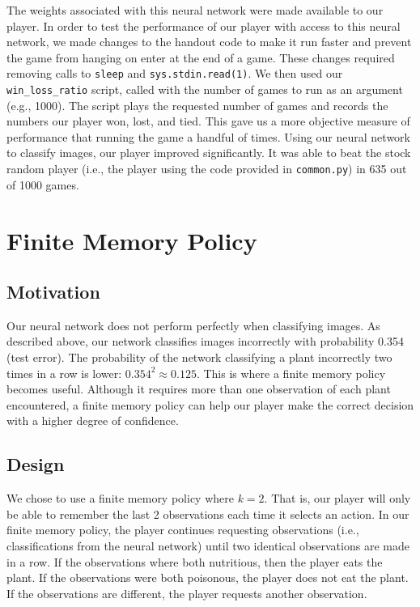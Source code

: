 \documentclass[solution, letterpaper]{cs121}
\begin{document}
The weights associated with this neural network were made available to our player. In order to test the performance of our player with access to this neural network, we made changes to the handout code to make it run faster and prevent the game from hanging on enter at the end of a game. These changes required removing calls to {\tt sleep} and {\tt sys.stdin.read(1)}. We then used our {\tt win\_loss\_ratio} script, called with the number of games to run as an argument (e.g., 1000). The script plays the requested number of games and records the numbers our player won, lost, and tied. This gave us a more objective measure of performance that running the game a handful of times. Using our neural network to classify images, our player improved significantly. It was able to beat the stock random player (i.e., the player using the code provided in {\tt common.py}) in 635 out of 1000 games.

\section{Finite Memory Policy}
\subsection{Motivation}
\hspace{4mm} Our neural network does not perform perfectly when classifying images. As described above, our network classifies images incorrectly with probability 0.354 (test error). The probability of the network classifying a plant incorrectly two times in a row is lower: $0.354^2 \approx 0.125$. This is where a finite memory policy becomes useful. Although it requires more than one observation of each plant encountered, a finite memory policy can help our player make the correct decision with a higher degree of confidence.

\subsection{Design}
\hspace{4mm} We chose to use a finite memory policy where $k=2$. That is, our player will only be able to remember the last 2 observations each time it selects an action. In our finite memory policy, the player continues requesting observations (i.e., classifications from the neural network) until two identical observations are made in a row. If the observations where both nutritious, then the player eats the plant. If the observations were both poisonous, the player does not eat the plant. If the observations are different, the player requests another observation.
\end{document}
